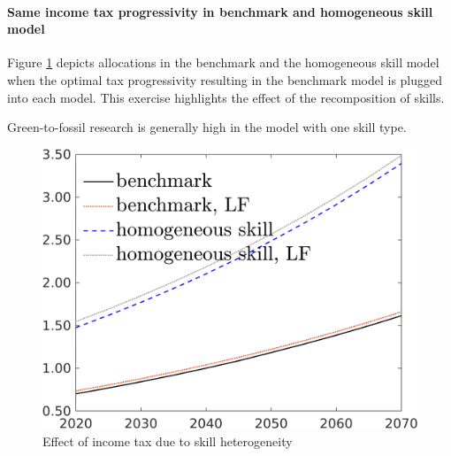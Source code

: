 \paragraph{Same income tax progressivity in benchmark and homogeneous skill model}
Figure \ref{fig:count_taul_nsk} depicts allocations in the benchmark and the homogeneous skill model when the optimal tax progressivity resulting in the benchmark model is plugged into each model. This exercise highlights the effect of the recomposition of skills.

Green-to-fossil research is generally high in the model with one skill type. 
\begin{figure}[h!!]
	\centering
	\caption{Effect of income tax due to skill heterogeneity }\label{fig:count_taul_nsk}
	\begin{minipage}[]{0.32\textwidth}
		\includegraphics[width=1\textwidth]{../../codding_model/own_basedOnFried/optimalPol_190722_tidiedUp/figures/all_10Aout22/CountNskTaulLF_target_C_spillover0_sep1_extern0_PV1_etaa0.79_lgd1.png}
	\end{minipage}
	\begin{minipage}[]{0.32\textwidth}

\end{minipage}
\end{figure}
